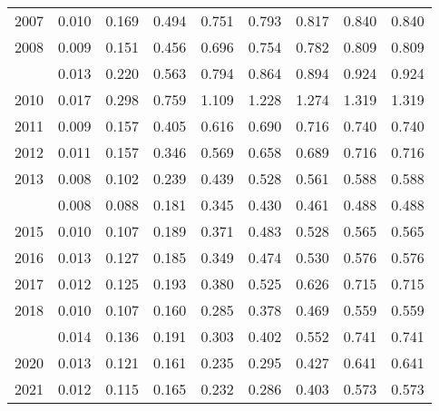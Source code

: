 \documentclass[
]{article}
\begin{document}
\begin{longtable}[t]{lrrrrrrrr}
2007 & 0.010 & 0.169 & 0.494 & 0.751 & 0.793 & 0.817 & 0.840 & 0.840\\
2008 & 0.009 & 0.151 & 0.456 & 0.696 & 0.754 & 0.782 & 0.809 & 0.809\\
\addlinespace
2009 & 0.013 & 0.220 & 0.563 & 0.794 & 0.864 & 0.894 & 0.924 & 0.924\\
2010 & 0.017 & 0.298 & 0.759 & 1.109 & 1.228 & 1.274 & 1.319 & 1.319\\
2011 & 0.009 & 0.157 & 0.405 & 0.616 & 0.690 & 0.716 & 0.740 & 0.740\\
2012 & 0.011 & 0.157 & 0.346 & 0.569 & 0.658 & 0.689 & 0.716 & 0.716\\
2013 & 0.008 & 0.102 & 0.239 & 0.439 & 0.528 & 0.561 & 0.588 & 0.588\\
\addlinespace
2014 & 0.008 & 0.088 & 0.181 & 0.345 & 0.430 & 0.461 & 0.488 & 0.488\\
2015 & 0.010 & 0.107 & 0.189 & 0.371 & 0.483 & 0.528 & 0.565 & 0.565\\
2016 & 0.013 & 0.127 & 0.185 & 0.349 & 0.474 & 0.530 & 0.576 & 0.576\\
2017 & 0.012 & 0.125 & 0.193 & 0.380 & 0.525 & 0.626 & 0.715 & 0.715\\
2018 & 0.010 & 0.107 & 0.160 & 0.285 & 0.378 & 0.469 & 0.559 & 0.559\\
\addlinespace
2019 & 0.014 & 0.136 & 0.191 & 0.303 & 0.402 & 0.552 & 0.741 & 0.741\\
2020 & 0.013 & 0.121 & 0.161 & 0.235 & 0.295 & 0.427 & 0.641 & 0.641\\
2021 & 0.012 & 0.115 & 0.165 & 0.232 & 0.286 & 0.403 & 0.573 & 0.573\\*
\end{longtable}
\end{document}
